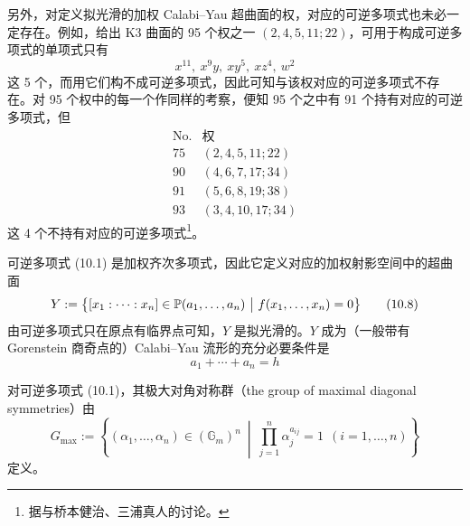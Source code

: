 另外，对定义拟光滑的加权 Calabi–Yau 超曲面的权，对应的可逆多项式也未必一定存在。例如，给出 K3 曲面的 95 个权之一 $(2,4,5,11;22)$，可用于构成可逆多项式的单项式只有
\begin{equation}
    x^{11},\ x^{9}y,\ xy^{5},\ xz^{4},\ w^{2} \tag{10.6}
\end{equation}
这 5 个，而用它们构不成可逆多项式，因此可知与该权对应的可逆多项式不存在。对 95 个权中的每一个作同样的考察，便知 95 个之中有 91 个持有对应的可逆多项式，但
\begin{equation}
    \begin{array}{c|l}
        \mathrm{No.} & \text{权} \\ \hline
        75 & (2,4,5,11;22) \\
        90 & (4,6,7,17;34) \\
        91 & (5,6,8,19;38) \\
        93 & (3,4,10,17;34)
    \end{array}
    \tag{10.7}
\end{equation}
这 4 个不持有对应的可逆多项式\footnote{据与桥本健治、三浦真人的讨论。}。

可逆多项式 (10.1) 是加权齐次多项式，因此它定义对应的加权射影空间中的超曲面
\begin{equation}
    Y:=\bigl\{[x_1:\cdots:x_n]\in\PP(a_1,\ldots,a_n)\ \big|\ f(x_1,\ldots,x_n)=0\bigr\} \tag{10.8}
\end{equation}
由可逆多项式只在原点有临界点可知，$Y$ 是拟光滑的。$Y$ 成为（一般带有 Gorenstein 商奇点的）Calabi–Yau 流形的充分必要条件是
\begin{equation}
    a_1+\cdots+a_n=h \tag{10.9}
\end{equation}

对可逆多项式 (10.1)，其极大对角对称群（the group of maximal diagonal symmetries）由
\begin{equation}
    G_{\max}:=\left\{(\alpha_1,\ldots,\alpha_n)\in(\mathbb{G}_m)^{n}\ \middle|\ \prod_{j=1}^{n}\alpha_j^{a_{ij}}=1\ \ (i=1,\ldots,n)\right\} \tag{10.10}
\end{equation}
定义。

